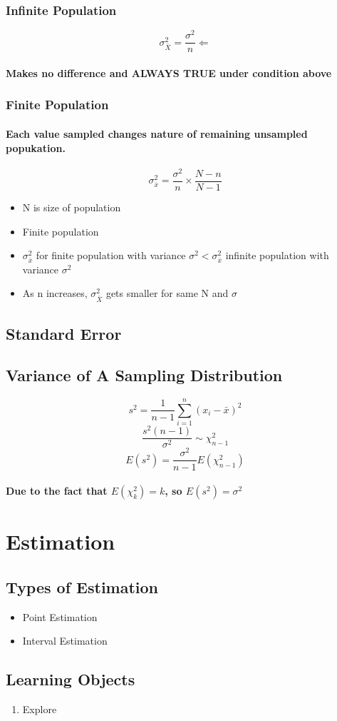 \documentclass[11pt]{article} %
\begin{document}
\subsubsection{Infinite Population}
$$ \sigma_{\bar{X}}^2 = \frac{\sigma^2}{n} \Leftarrow $$
\paragraph{Makes no difference and ALWAYS TRUE under condition above}
% 
% 
\subsubsection{Finite Population}
\paragraph{Each value sampled changes nature of remaining unsampled popukation.}
$$ \sigma_{\bar{x}}^2=\frac{\sigma^2}{n} \times \frac{N-n}{N-1}$$
\begin{itemize}
    \item N is size of population
    \item Finite population
    \item $\sigma_{\bar{x}}^2$ for finite population with variance $\sigma^2 < \sigma_{\bar{x}}^2$ infinite population with variance $\sigma^2$
    \item As n increases, $\sigma_{\bar{X}}^2$ gets smaller for same N and $\sigma$
\end{itemize}
% 
% 
% 
% 
% 
% 
% 
% 
\subsection{Standard Error}
\subsection{Variance of A Sampling Distribution}
% 
% 
$$ s^2=\frac{1}{n-1} \sum_{i=1}^{n} (x_i-\bar{x})^2 $$
% 
% 
$$ \frac{s^2(n-1)}{\sigma^2} \sim \chi_{n-1}^2 $$
% 
% 
$$ E(s^2) = \frac{\sigma^2}{n-1}E(\chi_{n-1}^2) $$
% 
\paragraph{Due to the fact that $E(\chi_k^2)=k$, so $E(s^2)=\sigma^2$}
% 
% 
% 
% 
% 
% 
% 
% 
% 
% 
% 
% 
% 
% 
% 
% 
% 
% 
% 
% 
% 
% 
% 
% 
% 
% 
% 
% 
% 
% 
% 
\section{Estimation}
% 
% 
\subsection{Types of Estimation}
\begin{itemize}
    \item Point Estimation
    \item Interval Estimation
\end{itemize}
% 
% 
\subsection{Learning Objects}
\begin{enumerate}
    \item Explore
\end{enumerate}
% 
% 
% 
% 
% 
% 
% 
% 
% 
% 
% 
% 
% 
% 
% 
% 
% 
% 
% 
% 
% 
% 
% 
%
\end{document}

